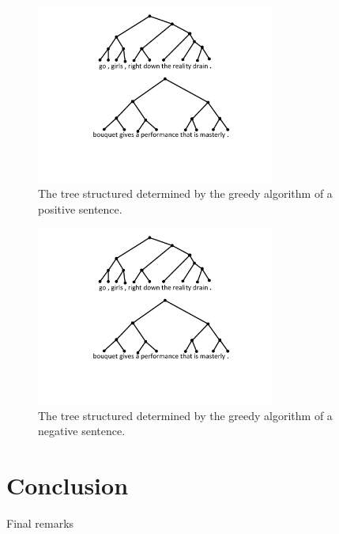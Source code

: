 \documentclass{article}
\begin{document}
\begin{figure}[h]
\begin{center}
    \includegraphics[width=0.7\textwidth]{tree_positive}
    \caption{The tree structured determined by the greedy algorithm of a positive sentence.}
    \label{fig:tree_positive}
\end{center}
\end{figure}


\begin{figure}[h]
\begin{center}
    \includegraphics[width=0.7\textwidth]{tree_positive}
    \caption{The tree structured determined by the greedy algorithm of a negative sentence.}
    \label{fig:tree_negative}
\end{center}
\end{figure}




\section{Conclusion}
Final remarks




\small{


}
\end{document}

